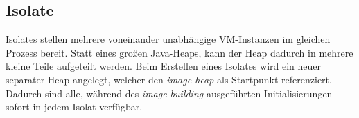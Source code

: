 \subsection{Isolate}
\label{subsec:isolate}

Isolates stellen mehrere voneinander unabhängige VM-Instanzen im gleichen Prozess bereit. Statt eines großen Java-Heaps,
kann der Heap dadurch in mehrere kleine Teile aufgeteilt werden. Beim Erstellen eines Isolates wird ein neuer separater 
Heap angelegt, welcher den \textit{image heap} als Startpunkt referenziert. Dadurch sind alle, während des \textit{image building}
ausgeführten Initialisierungen sofort in jedem Isolat verfügbar. 
